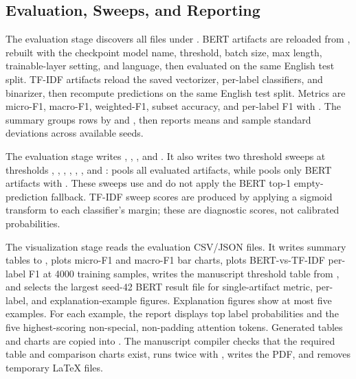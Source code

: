 \documentclass[12pt,a4paper]{article}
\begin{document}
\subsection{Evaluation, Sweeps, and Reporting}

The evaluation stage discovers all  files under . BERT artifacts are reloaded from , rebuilt with the checkpoint model name, threshold, batch size, max length, trainable-layer setting, and language, then evaluated on the same English test split. TF-IDF artifacts reload the saved vectorizer, per-label classifiers, and binarizer, then recompute predictions on the same English test split. Metrics are micro-F1, macro-F1, weighted-F1, subset accuracy, and per-label F1 with . The summary groups rows by  and , then reports means and sample standard deviations across available seeds.

The evaluation stage writes , , , and . It also writes two threshold sweeps at thresholds , , , , , , and :  pools all evaluated artifacts, while  pools only BERT artifacts with . These sweeps use  and do not apply the BERT top-1 empty-prediction fallback. TF-IDF sweep scores are produced by applying a sigmoid transform to each classifier's  margin; these are diagnostic scores, not calibrated probabilities.

The visualization stage reads the evaluation CSV/JSON files. It writes summary tables to , plots micro-F1 and macro-F1 bar charts, plots BERT-vs-TF-IDF per-label F1 at 4000 training samples, writes the manuscript threshold table from , and selects the largest seed-42 BERT result file for single-artifact metric, per-label, and explanation-example figures. Explanation figures show at most five examples. For each example, the report displays top label probabilities and the five highest-scoring non-special, non-padding attention tokens. Generated tables and charts are copied into . The manuscript compiler checks that the required table and comparison charts exist, runs  twice with , writes the PDF, and removes temporary LaTeX files.
\end{document}
